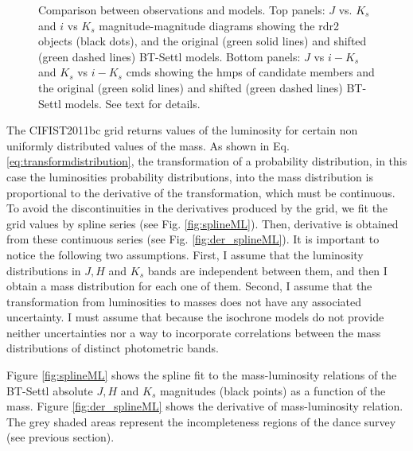 \begin{figure}[ht!]
\begin{subfigure}[t]{0.45\textwidth}
        \caption{}
    \end{subfigure}
\caption{Comparison between observations and models. Top panels: $J$ vs. $K_s$ and $i$ vs $K_s$ magnitude-magnitude diagrams showing the \gls{rdr2} objects (black dots), and the original (green solid lines) and shifted (green dashed lines) BT-Settl models. Bottom panels: $J$ vs $i-K_s$ and $K_s$ vs $i-K_s$ \glspl{cmd} showing the \gls{hmps} of candidate members and the original (green solid lines) and shifted (green dashed lines) BT-Settl models. See text for details.}
\label{fig:BHM_vs_BT-Settl}
\end{figure}

The CIFIST2011bc grid returns values of the luminosity for certain non uniformly distributed values of the mass. As shown in Eq. \ref{eq:transformdistribution}, the transformation of a probability distribution, in this case the luminosities probability distributions, into the mass distribution is proportional to the derivative of the transformation, which must be continuous. To avoid the discontinuities in the derivatives produced by the grid, we fit the grid values by spline series (see Fig. \ref{fig:splineML}). Then, derivative is obtained from these continuous series (see Fig. \ref{fig:der_splineML}). It is important to notice the following two assumptions. First, I assume that the luminosity distributions in $J,H$ and $K_s$ bands are independent between them, and then I obtain a mass distribution for each one of them. Second, I assume that the transformation from luminosities to masses does not have any associated uncertainty. I must assume that because the isochrone models do not provide neither uncertainties nor a way to incorporate correlations between the mass distributions of distinct photometric bands. 

Figure \ref{fig:splineML} shows the spline fit to the mass-luminosity relations of the BT-Settl absolute $J,H$ and $K_s$ magnitudes (black points) as a function of the mass. Figure \ref{fig:der_splineML} shows the derivative of mass-luminosity relation. The grey shaded areas represent the incompleteness regions of the \gls{dance} survey (see previous section).

